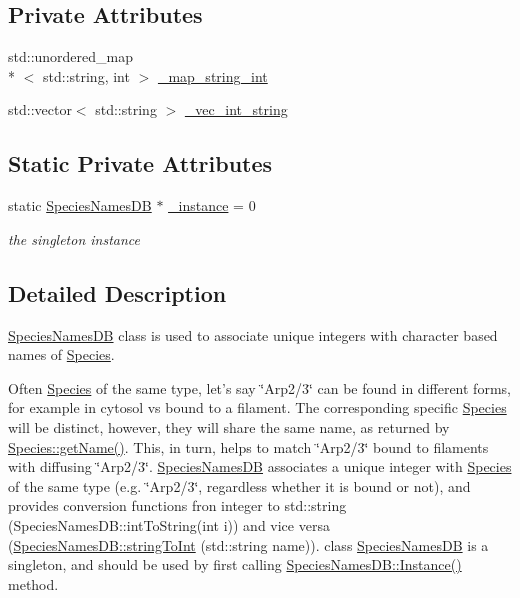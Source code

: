 \subsection*{Private Attributes}
\begin{DoxyCompactItemize}
\item 
std\-::unordered\-\_\-map\\*
$<$ std\-::string, int $>$ \hyperlink{classchem_1_1SpeciesNamesDB_a2c70229e074e0997a876559ecb622fbb}{\-\_\-map\-\_\-string\-\_\-int}
\item 
std\-::vector$<$ std\-::string $>$ \hyperlink{classchem_1_1SpeciesNamesDB_ae9184194e3b6d35c36b43020bde04724}{\-\_\-vec\-\_\-int\-\_\-string}
\end{DoxyCompactItemize}
\subsection*{Static Private Attributes}
\begin{DoxyCompactItemize}
\item 
static \hyperlink{classchem_1_1SpeciesNamesDB}{Species\-Names\-D\-B} $\ast$ \hyperlink{classchem_1_1SpeciesNamesDB_a885f8676103893c462153cef1e47af0d}{\-\_\-instance} = 0
\begin{DoxyCompactList}\small\item\em the singleton instance \end{DoxyCompactList}\end{DoxyCompactItemize}


\subsection{Detailed Description}
\hyperlink{classchem_1_1SpeciesNamesDB}{Species\-Names\-D\-B} class is used to associate unique integers with character based names of \hyperlink{classchem_1_1Species}{Species}. 

Often \hyperlink{classchem_1_1Species}{Species} of the same type, let's say \char`\"{}\-Arp2/3\char`\"{} can be found in different forms, for example in cytosol vs bound to a filament. The corresponding specific \hyperlink{classchem_1_1Species}{Species} will be distinct, however, they will share the same name, as returned by \hyperlink{classchem_1_1Species_aa32c8f7fb344c68539a927c6a7f916c7}{Species\-::get\-Name()}. This, in turn, helps to match \char`\"{}\-Arp2/3\char`\"{} bound to filaments with diffusing \char`\"{}\-Arp2/3\char`\"{}. \hyperlink{classchem_1_1SpeciesNamesDB}{Species\-Names\-D\-B} associates a unique integer with \hyperlink{classchem_1_1Species}{Species} of the same type (e.\-g. \char`\"{}\-Arp2/3\char`\"{}, regardless whether it is bound or not), and provides conversion functions fron integer to std\-::string (Species\-Names\-D\-B\-::int\-To\-String(int i)) and vice versa (\hyperlink{classchem_1_1SpeciesNamesDB_acbb96b1e9cc8fee95c5b5f1b464cd5bd}{Species\-Names\-D\-B\-::string\-To\-Int} (std\-::string name)). class \hyperlink{classchem_1_1SpeciesNamesDB}{Species\-Names\-D\-B} is a singleton, and should be used by first calling \hyperlink{classchem_1_1SpeciesNamesDB_af7921b9f52c8ed078718821bdb993109}{Species\-Names\-D\-B\-::\-Instance()} method.


